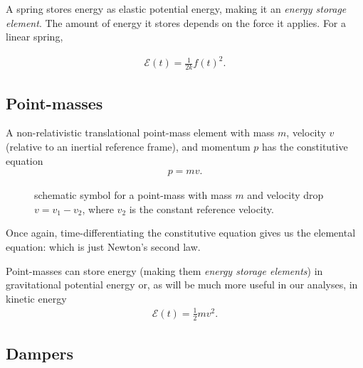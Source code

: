 \documentclass[dynamic_systems.tex]{subfiles}
\begin{document}
A spring stores energy as elastic potential energy, making it an \emph{energy storage element}.
The amount of energy it stores depends on the force it applies.
For a linear spring,
\tags{}

\begin{align}
	\mathcal{E}(t) = \frac{1}{2 k} f(t)^2.
\end{align}

\subsection{Point-masses}
\tags{}

A non-relativistic translational point-mass element with mass $m$, velocity $v$ (relative to an inertial reference frame), and momentum $p$ has the constitutive equation
\begin{align}
	p = m v.
\end{align}
\begin{wrapfigure}[8]{r}{0.35\textwidth}
  \centering
  \caption{\label{fig:mass} schematic symbol for a point-mass with mass $m$ and velocity drop $v = v_1 - v_2$, where $v_2$ is the constant reference velocity.}%
\end{wrapfigure}
Once again, time-differentiating the constitutive equation gives us the elemental equation:
\noindent which is just Newton's second law.

Point-masses can store energy (making them \emph{energy storage elements}) in gravitational potential energy or, as will be much more useful in our analyses, in kinetic energy
\begin{align}
	\mathcal{E}(t) = \frac{1}{2} m v^2.
\end{align}

\subsection{Dampers}
\end{document}
